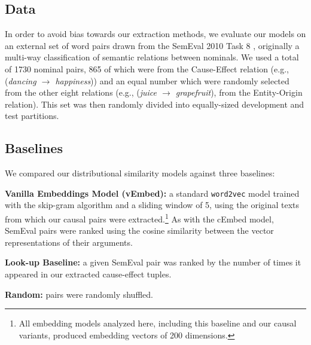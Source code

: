 \subsection{Data}
In order to avoid bias towards our extraction methods, we evaluate our models on an external set of word pairs drawn from the SemEval 2010 Task 8 \cite{hendrickx2009semeval}, originally a multi-way classification of semantic relations between nominals.  We used a total of 1730 nominal pairs, 865 of which were from the Cause-Effect relation (e.g., (\emph{dancing $\rightarrow$ happiness})) and an equal number which were randomly selected from the other eight relations (e.g., (\emph{juice $\rightarrow$ grapefruit}), from the Entity-Origin relation).  This set was then randomly divided into equally-sized development and test partitions.

\subsection{Baselines}
We compared our distributional similarity models against three baselines:

{\flushleft \textbf{Vanilla Embeddings Model (vEmbed):}} a standard \texttt{word2vec} model trained with the skip-gram algorithm and a sliding window of 5, using the original texts from which our causal pairs were extracted.\footnote{All embedding models analyzed here, including this baseline and our causal variants, produced embedding vectors of 200 dimensions.} As with the cEmbed model, SemEval pairs were ranked using the cosine similarity between the vector representations of their arguments.

{\flushleft \textbf{Look-up Baseline:}} a given SemEval pair was ranked by the number of times it appeared in our extracted cause-effect tuples. 

{\flushleft \textbf{Random:}} pairs were randomly shuffled.



